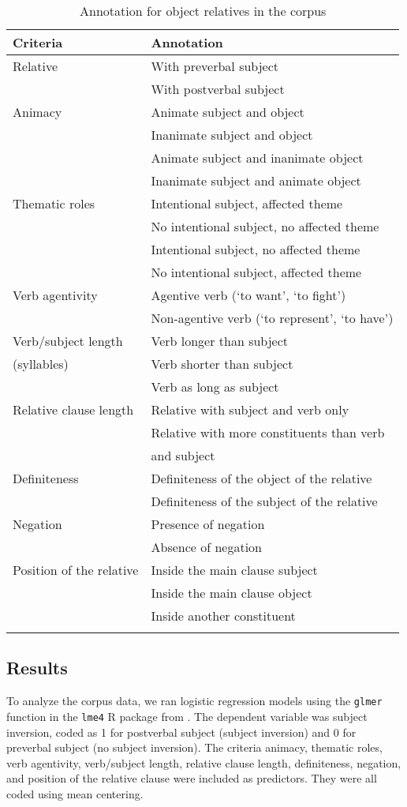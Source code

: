 \documentclass[output=paper]{langscibook}
\begin{document}
\begin{table}
\begin{tabular}{ll} 
  \lsptoprule
    Criteria & Annotation\\ 
  \midrule
  Relative &  With preverbal subject \\
& With postverbal subject\\
  Animacy  &   Animate subject and object \\
& Inanimate subject and object \\
& Animate subject and inanimate object \\
& Inanimate subject and animate object \\
Thematic roles & Intentional subject, affected theme \\
& No intentional subject, no affected theme \\
& Intentional subject, no affected theme \\
& No intentional subject, affected theme \\
Verb agentivity & Agentive verb (‘to want’, ‘to fight’) \\
& Non-agentive verb (‘to represent’, ‘to have’) \\ 
Verb/subject length  & Verb longer than subject  \\
(syllables) & Verb shorter than subject \\
& Verb as long as subject \\
Relative clause length & Relative with subject and verb only \\
& Relative with more constituents than verb \\
             &  and subject\\
      Definiteness & Definiteness of the object of the relative \\
& Definiteness of the subject of the relative \\
Negation & Presence of negation \\
& Absence of negation \\
Position of the relative & Inside the main clause subject \\
& Inside the main clause object \\
& Inside another constituent \\
  \lspbottomrule
    \end{tabular}
 \caption{Annotation for object relatives in the corpus\label{tab:1:annotation}}
\end{table}


\subsection{Results}
To analyze the corpus data, we ran logistic regression models using
the \texttt{glmer} function in the \texttt{lme4} R package from \citet{Bates2015}. The
dependent variable was subject inversion, coded as 1 for postverbal
subject (subject inversion) and 0 for preverbal subject (no subject
inversion). The criteria animacy, thematic roles, verb agentivity, verb/subject length,
relative clause length, definiteness, negation, and position of the
relative clause were included as predictors. They were all coded using mean centering.
\end{document}

